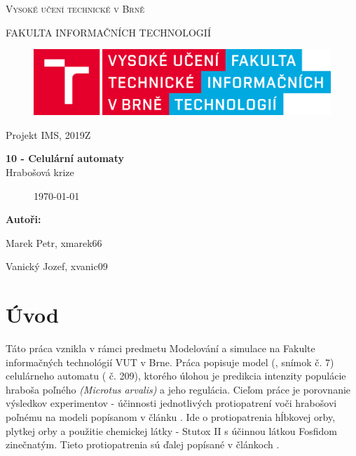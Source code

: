 \documentclass[a4paper,11pt]{article}
\begin{document}

\begin{titlepage}
\begin{center}
    {\Huge \textsc{Vysoké učení technické v Brně}}
    
    {\LARGE \uppercase{FAKULTA INFORMAČNÍCH TECHNOLOGIÍ}}
    
\begin{figure}[h]
\vspace{5.0cm}
\centering
\includegraphics[scale=0.15]{logo.png}
\vspace{-10.0cm}
\end{figure}
    
	{\LARGE Projekt IMS, 2019Z}

	{\Huge \textbf{10 - Celulární automaty}}
\\

{\LARGE {Hrabošová krize}}\\

\begin{figure}[h]
\centering
{\Large {\mydate\today}}
\vspace{6cm}
\end{figure}

\end{center}
\begin{compactitem}
\item[] \textbf{Autoři:}
\item[] Marek Petr, xmarek66
\item[] Vanický Jozef, xvanic09
\end{compactitem}

\end{titlepage}

\tableofcontents
\newpage

\section{Úvod}
Táto práca vznikla v rámci predmetu Modelování a simulace na Fakulte informačných technológií VUT v Brne. Práca popisuje model (\cite{slajdy}, snímok č. 7) celulárneho automatu (\cite{slajdy} č. 209), ktorého úlohou je predikcia intenzity populácie hraboša poľného \textit{(Microtus arvalis)} a jeho regulácia. Cieľom práce je porovnanie výsledkov experimentov - účinnosti jednotlivých protiopatrení voči hrabošovi poľnému na modeli popísanom v článku \cite{XYZ} . Ide o protiopatrenia hĺbkovej orby, plytkej orby a použitie chemickej látky - Stutox II s účinnou látkou Fosfidom zinečnatým. Tieto protiopatrenia sú ďalej popísané v článkoch \citep{XYZ} \cite{XYZ}. 
\end{document}
